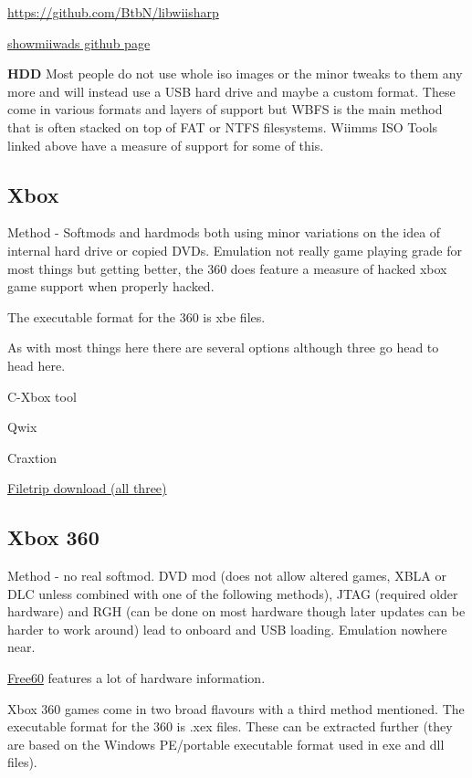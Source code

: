 \documentclass[
]{book}
\begin{document}
\href{http://libwiisharp\%20github\%20page}{https://github.com/BtbN/libwiisharp}

\href{https://github.com/Plombo/showmiiwads}{showmiiwads github page}

\textbf{HDD} Most people do not use whole iso images or the minor tweaks to them any more and will instead use a USB hard drive and maybe a custom format. These come in various formats and layers of support but WBFS is the main method that is often stacked on top of FAT or NTFS filesystems. Wiimms ISO Tools linked above have a measure of support for some of this.

\hypertarget{xbox}{%
\subsection{Xbox}\label{xbox}}

Method - Softmods and hardmods both using minor variations on the idea of internal hard drive or copied DVDs. Emulation not really game playing grade for most things but getting better, the 360 does feature a measure of hacked xbox game support when properly hacked.

The executable format for the 360 is xbe files.

As with most things here there are several options although three go head to head here.

C-Xbox tool

Qwix

Craxtion

\href{http://filetrip.net/oldies-downloads/xbox/iso-hacks-tools/}{Filetrip download (all three)}

\hypertarget{xbox-360}{%
\subsection{Xbox 360}\label{xbox-360}}

Method - no real softmod. DVD mod (does not allow altered games, XBLA or DLC unless combined with one of the following methods), JTAG (required older hardware) and RGH (can be done on most hardware though later updates can be harder to work around) lead to onboard and USB loading. Emulation nowhere near.

\href{http://free60.org/Main_Page}{Free60} features a lot of hardware information.

Xbox 360 games come in two broad flavours with a third method mentioned. The executable format for the 360 is .xex files. These can be extracted further (they are based on the Windows PE/portable executable format used in exe and dll files).
\end{document}
